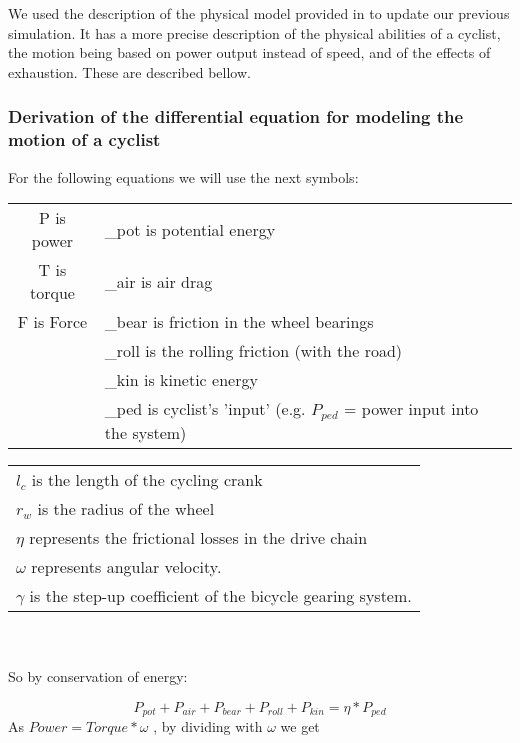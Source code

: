 \documentclass[10pt, a4paper]{report}
\begin{document}
We used the description of the physical model provided in \cite{MathModel} to update our previous simulation. It has a more precise description of the physical abilities of a cyclist, the motion being based on power output instead of speed, and of the effects of exhaustion. These are described bellow.

\subsubsection{Derivation of the differential equation for modeling the motion of a cyclist}

For the following equations we will use the next symbols: \\

\begin{tabularx}{\linewidth}{|c|X|}
\hline
P is power	&	\_pot is potential energy	\\
T is torque	&	\_air is air drag			\\
F is Force 	&  	\_bear is friction in the wheel bearings \\
			& 	\_roll is the rolling friction (with the road) \\
			& 	\_kin is kinetic energy \\
			&	\_ped is cyclist's 'input' (e.g. $P_{ped}$ = power input into the system) \\
\hline
\end{tabularx}

\begin{tabularx}{\linewidth}{|X|}

$l_{c}$  is the length of the cycling crank \\
$r_{w}$  is the radius of the wheel \\
$\eta$ 		represents the frictional losses in the drive chain \\
$\omega$ 	represents angular velocity.\\
$\gamma$	is the step-up coefficient of the bicycle gearing system.  \\
\hline
\end{tabularx}
\\\\
So by conservation of energy:

$$P_{pot} + P_{air} + P_{bear} + P_{roll} + P_{kin} = \eta * P_{ped}$$
As $Power = Torque * \omega$ , by dividing with $\omega$ we get
\end{document}
